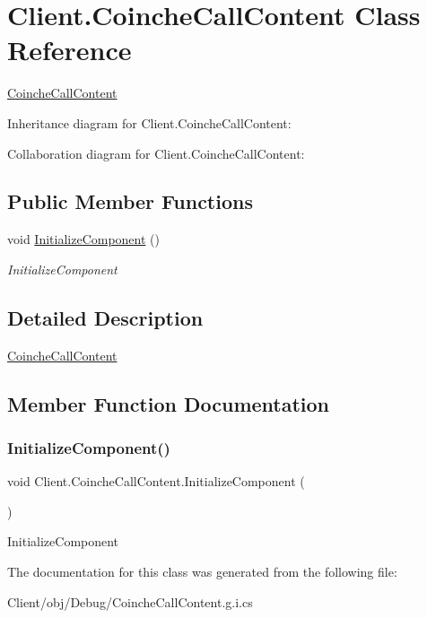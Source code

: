 \hypertarget{class_client_1_1_coinche_call_content}{}\section{Client.\+Coinche\+Call\+Content Class Reference}
\label{class_client_1_1_coinche_call_content}


\hyperlink{class_client_1_1_coinche_call_content}{Coinche\+Call\+Content}  




Inheritance diagram for Client.\+Coinche\+Call\+Content\+:


Collaboration diagram for Client.\+Coinche\+Call\+Content\+:
\subsection*{Public Member Functions}
\begin{DoxyCompactItemize}
\item 
void \hyperlink{class_client_1_1_coinche_call_content_aff42acef2905ac53f67a292697c0078a}{Initialize\+Component} ()
\begin{DoxyCompactList}\small\item\em Initialize\+Component \end{DoxyCompactList}\end{DoxyCompactItemize}


\subsection{Detailed Description}
\hyperlink{class_client_1_1_coinche_call_content}{Coinche\+Call\+Content} 



\subsection{Member Function Documentation}
\mbox{\label{class_client_1_1_coinche_call_content_aff42acef2905ac53f67a292697c0078a}} 
\subsubsection{\texorpdfstring{Initialize\+Component()}{InitializeComponent()}}
{\footnotesize\ttfamily void Client.\+Coinche\+Call\+Content.\+Initialize\+Component (\begin{DoxyParamCaption}{ }\end{DoxyParamCaption})\hspace{0.3cm}{\ttfamily [inline]}}



Initialize\+Component 



The documentation for this class was generated from the following file\+:\begin{DoxyCompactItemize}
\item 
Client/obj/\+Debug/Coinche\+Call\+Content.\+g.\+i.\+cs\end{DoxyCompactItemize}
